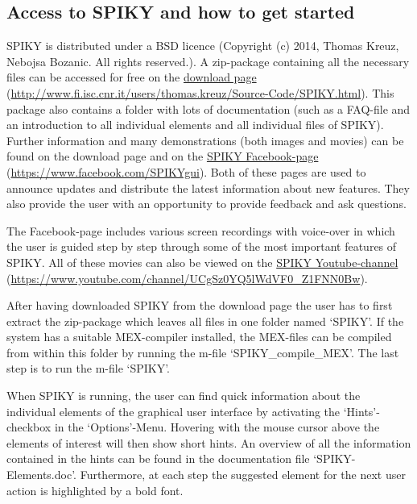 \documentclass[10pt,twocolumn]{elsart5p}
\begin{document}
\subsection{\label{ss:Access} Access to SPIKY and how to get started}

SPIKY is distributed under a BSD licence (Copyright (c) 2014, Thomas Kreuz, Nebojsa Bozanic. All rights reserved.). A zip-package containing all the necessary files can be accessed for free on the \href{http://www.fi.isc.cnr.it/users/thomas.kreuz/Source-Code/SPIKY.html}{download page} (\url{http://www.fi.isc.cnr.it/users/thomas.kreuz/Source-Code/SPIKY.html}). This package also contains a folder with lots of documentation (such as a FAQ-file and an introduction to all individual elements and all individual files of SPIKY). Further information and many demonstrations (both images and movies) can be found on the download page and on the \href{https://www.facebook.com/SPIKYgui}{SPIKY Facebook-page} (\url{https://www.facebook.com/SPIKYgui}). Both of these pages are used to announce updates and distribute the latest information about new features. They also provide the user with an opportunity to provide feedback and ask questions.

The Facebook-page includes various screen recordings with voice-over in which the user is guided step by step through some of the most important features of SPIKY. All of these movies can also be viewed on the \href{https://www.youtube.com/channel/UCgSz0YQ5lWdVF0_Z1FNN0Bw}{SPIKY Youtube-channel} (\url{https://www.youtube.com/channel/UCgSz0YQ5lWdVF0_Z1FNN0Bw}).

After having downloaded SPIKY from the download page the user has to first extract the zip-package which leaves all files in one folder named `SPIKY'. If the system has a suitable MEX-compiler installed, the MEX-files can be compiled from within this folder by running the m-file `SPIKY\_compile\_MEX'. The last step is to run the m-file `SPIKY'.

When SPIKY is running, the user can find quick information about the individual elements of the graphical user interface by activating the `Hints'-checkbox in the `Options'-Menu. Hovering with the mouse cursor above the elements of interest will then show short hints. An overview of all the information contained in the hints can be found in the documentation file `SPIKY-Elements.doc'. Furthermore, at each step the suggested element for the next user action is highlighted by a bold font. 
\end{document}

